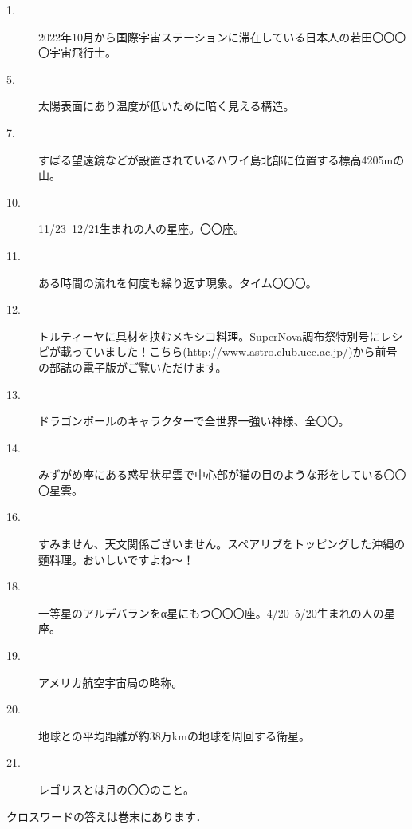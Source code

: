 \documentclass[supernova_2023]{subfiles}
\begin{document}
\begin{tcolorbox}[title=よこのカギ]
  \begin{description}
    \item[1. ] 2022年10月から国際宇宙ステーションに滞在している日本人の若田〇〇〇〇宇宙飛行士。
    \item[5. ] 太陽表面にあり温度が低いために暗く見える構造。
    \item[7. ] すばる望遠鏡などが設置されているハワイ島北部に位置する標高4205mの山。
    \item[10. ] 11/23~12/21生まれの人の星座。〇〇座。
    \item[11. ] ある時間の流れを何度も繰り返す現象。タイム〇〇〇。
    \item[12. ] トルティーヤに具材を挟むメキシコ料理。SuperNova調布祭特別号にレシピが載っていました！こちら(\url{http://www.astro.club.uec.ac.jp/})から前号の部誌の電子版がご覧いただけます。
    \item[13. ] ドラゴンボールのキャラクターで全世界一強い神様、全〇〇。
    \item[14. ] みずがめ座にある惑星状星雲で中心部が猫の目のような形をしている〇〇〇星雲。
    \item[16. ] すみません、天文関係ございません。スペアリブをトッピングした沖縄の麵料理。おいしいですよね～！
    \item[18. ] 一等星のアルデバランをα星にもつ〇〇〇座。4/20~5/20生まれの人の星座。
    \item[19. ] アメリカ航空宇宙局の略称。
    \item[20. ] 地球との平均距離が約38万kmの地球を周回する衛星。
    \item[21. ] レゴリスとは月の〇〇のこと。
  \end{description}
\end{tcolorbox}
\vspace{3\zw}
{\footnotesize クロスワードの答えは巻末にあります．}
\end{document}
